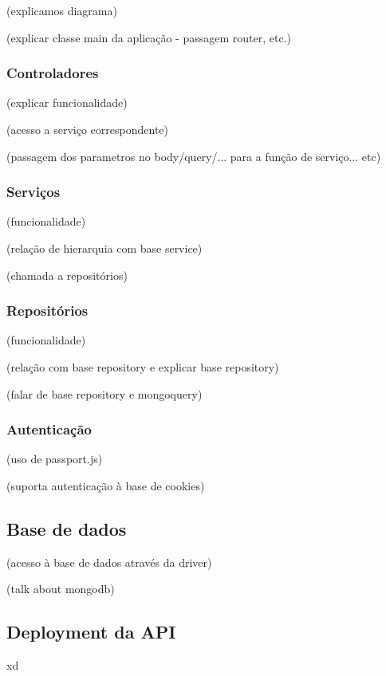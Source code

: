 (explicamos diagrama)

(explicar classe main da aplicação - passagem router, etc.)

\subsubsection{Controladores}

(explicar funcionalidade)

(acesso a serviço correspondente)

(passagem dos parametros no body/query/... para a função de serviço... etc)

\subsubsection{Serviços}

(funcionalidade)

(relação de hierarquia com base service)

(chamada a repositórios)

\subsubsection{Repositórios}

(funcionalidade)

(relação com base repository e explicar base repository)

(falar de base repository e mongoquery)

\subsubsection{Autenticação}

(uso de passport.js)

(suporta autenticação à base de cookies)

\subsection{Base de dados}

(acesso à base de dados através da driver)

(talk about mongodb)

\subsection{Deployment da API}

xd

\iffalse

